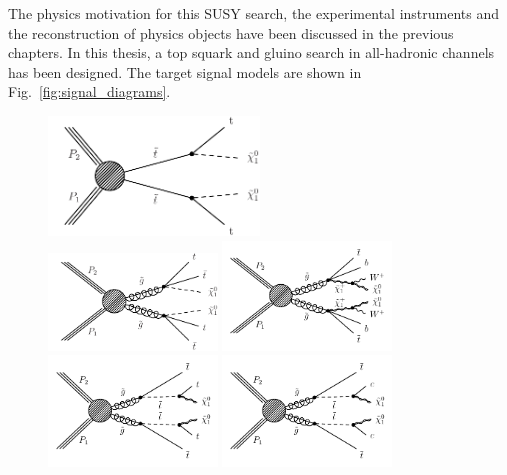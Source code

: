 The physics motivation for this SUSY search, the experimental instruments and the reconstruction of physics objects have been discussed in the previous chapters. In this thesis, a top squark and gluino search in all-hadronic channels has been designed. The target signal models are shown in Fig.~\ref{fig:signal_diagrams}.

\begin{figure}[ht!]
\begin{centering}
\includegraphics[width=0.50\textwidth]{sections/mc4/Introduction/figures/T2tt.pdf}\\
\includegraphics[width=0.40\textwidth]{sections/mc4/Introduction/figures/T1tttt_feynman.pdf}
\includegraphics[width=0.40\textwidth]{sections/mc4/Introduction/figures/T1ttbb.pdf}\\
\includegraphics[width=0.40\textwidth]{sections/mc4/Introduction/figures/T5tttt.pdf}
\includegraphics[width=0.40\textwidth]{sections/mc4/Introduction/figures/T5ttcc.pdf}\\

\end{centering}
\end{figure}
